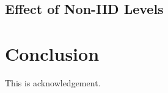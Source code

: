 \documentclass[sigconf]{acmart}
\begin{document}
\subsection{Effect of Non-IID Levels}


\FloatBarrier
\section{Conclusion}


\begin{acks}
This is acknowledgement.
\end{acks}



\end{document}

